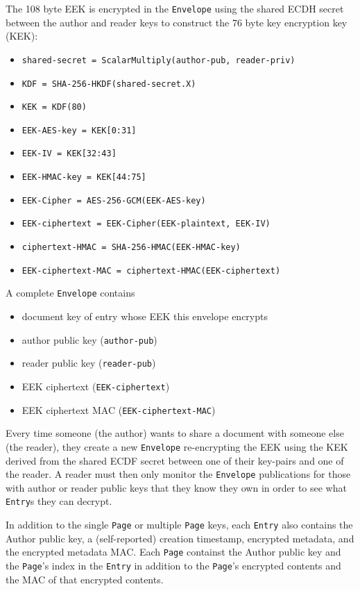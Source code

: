 \documentclass[10pt]{article}
\def\Entry{\texttt{Entry}}
\def\Page{\texttt{Page}}
\def\Envelope{\texttt{Envelope}}
\begin{document}
The 108 byte EEK is encrypted in the \Envelope{} using the shared ECDH secret between the author and reader keys to construct the 76 byte key encryption key (KEK):
\begin{itemize}
	\item \texttt{shared-secret = ScalarMultiply(author-pub, reader-priv)}
	\item \texttt{KDF = SHA-256-HKDF(shared-secret.X)}
	\item \texttt{KEK = KDF(80)}
	\item \texttt{EEK-AES-key = KEK[0:31]}
	\item \texttt{EEK-IV = KEK[32:43]}
	\item \texttt{EEK-HMAC-key = KEK[44:75]}
	\item \texttt{EEK-Cipher = AES-256-GCM(EEK-AES-key)}
	\item \texttt{EEK-ciphertext = EEK-Cipher(EEK-plaintext, EEK-IV)}
	\item \texttt{ciphertext-HMAC = SHA-256-HMAC(EEK-HMAC-key)}
	\item \texttt{EEK-ciphertext-MAC = ciphertext-HMAC(EEK-ciphertext)}
\end{itemize}

A complete \Envelope{} contains
\begin{itemize}
	\item document key of entry whose EEK this envelope encrypts
	\item author public key (\texttt{author-pub})
	\item reader public key (\texttt{reader-pub})
	\item EEK ciphertext (\texttt{EEK-ciphertext})
	\item EEK ciphertext MAC (\texttt{EEK-ciphertext-MAC})
\end{itemize}
Every time someone (the author) wants to share a document with someone else (the reader), they create a new \Envelope{} re-encrypting the EEK using the KEK derived from the shared ECDF secret between one of their key-pairs and one of the reader. A reader must then only monitor the \Envelope{} publications for those with author or reader public keys that they know they own in order to see what \Entry{}s they can decrypt.



In addition to the single \Page{} or multiple \Page{} keys, each \Entry{} also contains the Author public key, a (self-reported) creation timestamp, encrypted metadata, and the encrypted metadata MAC. Each \Page{} containst the Author public key and the \Page{}'s index in the \Entry{} in addition to the \Page{}'s encrypted contents and the MAC of that encrypted contents. 
\end{document}
